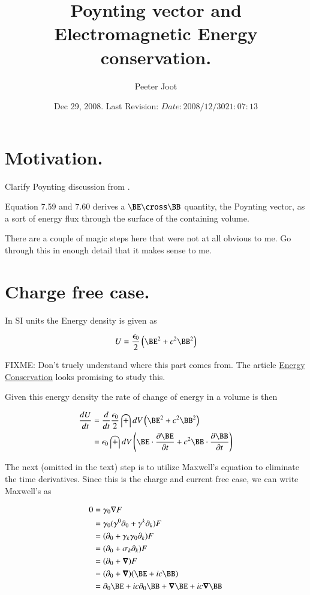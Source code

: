 \documentclass{article}
\title{ Poynting vector and Electromagnetic Energy conservation. }
\author{Peeter Joot}
\date{ Dec 29, 2008.  Last Revision: $Date: 2008/12/30 21:07:13 $ }
\begin{document}
\maketitle{}

\tableofcontents

\section{ Motivation. }

Clarify Poynting discussion from \cite{doran2003gap}.

Equation 7.59 and 7.60 derives a $\BE \cross \BB$ quantity, the Poynting vector, as a sort of energy flux through the surface of the containing volume.

There are a couple of magic steps here that were not at all obvious to me.  Go through this in enough detail that it makes sense to me.

\section{ Charge free case. }

In SI units the Energy density is given as

\begin{align*}
U = \frac{\epsilon_0}{2}\left( \BE^2 + c^2 \BB^2 \right)
\end{align*}

FIXME: Don't truely understand where this part comes from.  The article \href{http://farside.ph.utexas.edu/teaching/em/lectures/node89.html}{Energy Conservation} looks promising to study this.

Given this energy density the rate of change of energy in a volume is then

\begin{align*}
\frac{dU}{dt} 
&= 
\frac{d}{dt} 
\frac{\epsilon_0}{2} \int dV \left( \BE^2 + c^2 \BB^2 \right) \\
&= 
\epsilon_0 \int dV \left( \BE \cdot \PD{t}{\BE} + c^2 \BB \cdot \PD{t}{\BB} \right) \\
\end{align*}

The next (omitted in the text) step is to utilize Maxwell's equation to eliminate the time derivatives.  Since this is the
charge and current free case, we can write Maxwell's as

\begin{align*}
0
&= \gamma_0 \grad F \\
&= \gamma_0 (\gamma^0 \partial_0 + \gamma^k \partial_k) F \\
&= (\partial_0 + \gamma_k\gamma_0 \partial_k) F \\
&= (\partial_0 + \sigma_k \partial_k) F \\
&= (\partial_0 + \spacegrad)F \\
&= (\partial_0 + \spacegrad)(\BE + ic \BB) \\
&= \partial_0 \BE + ic \partial_0 \BB + \spacegrad \BE + ic \spacegrad \BB \\
\end{align*}
\end{document}
